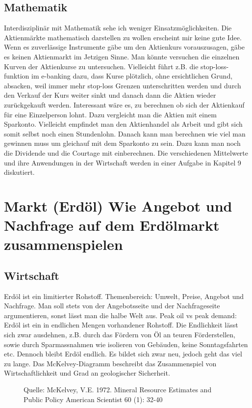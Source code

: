 \documentclass[11pt, twocolumn, a4paper]{scrartcl}
\begin{document}
\subsection{Mathematik}
Interdisziplinär mit Mathematik sehe ich weniger Einsatzmöglichkeiten. Die Aktienmärkte mathematisch darstellen zu wollen erscheint mir keine gute Idee. Wenn es zuverlässige Instrumente gäbe um den Aktienkurs vorauszusagen, gäbe es keinen Aktienmarkt im Jetzigen Sinne. Man könnte versuchen die einzelnen Kurven der Aktienkurse zu untersuchen. Vielleicht führt z.B. die \flqq stop-loss-funktion\frqq{} im e-banking dazu, dass Kurse plötzlich, ohne ersichtlichen Grund, absacken, weil immer mehr stop-loss Grenzen unterschritten werden und durch den Verkauf der Kurs weiter sinkt und danach dann die Aktien wieder zurückgekauft werden. Interessant wäre es, zu berechnen ob sich der Aktienkauf für eine Einzelperson lohnt. Dazu vergleicht man die Aktien mit einem Sparkonto. Vielleicht empfindet man den Aktienhandel als Arbeit und gibt sich somit selbst noch einen Stundenlohn. Danach kann man berechnen wie viel man gewinnen muss um gleichauf mit dem Sparkonto zu sein. Dazu kann man noch die Dividende und die Courtage mit einberechnen.
Die verschiedenen Mittelwerte und ihre Anwendungen in der Wirtschaft werden in einer Aufgabe in Kapitel 9 diskutiert.

\section{Markt (Erdöl) \flqq Wie Angebot und Nachfrage auf dem Erdölmarkt zusammenspielen\frqq}

\subsection{Wirtschaft}
Erdöl ist ein limitierter Rohstoff. Themenbereich: Umwelt, Preise, Angebot und Nachfrage. Man soll stets von der Angebotsseite und der Nachfrageseite argumentieren, sonst lässt man die halbe Welt aus. \frqq Peak oil vs peak demand\frqq: Erdöl ist ein in endlichen Mengen vorhandener Rohstoff. Die Endlichkeit lässt sich zwar ausdehnen, z.B. durch das Fördern von Öl an teuren Förderstellen, sowie durch Sparmassnahmen wie isolieren von Gebäuden, keine Sonntagsfahrten etc. Dennoch bleibt Erdöl endlich. Es bildet sich zwar neu, jedoch geht das viel zu lange. Das McKelvey-Diagramm beschreibt das Zusammenspiel von Wirtschaftlichkeit und Grad an geologischer Sicherheit.
\begin{figure}
\caption{Quelle: McKelvey, V.E. 1972. \flqq Mineral Resource Estimates and Public Policy\frqq{} American Scientist 60 (1): 32-40}
\end{figure}
\end{document}
